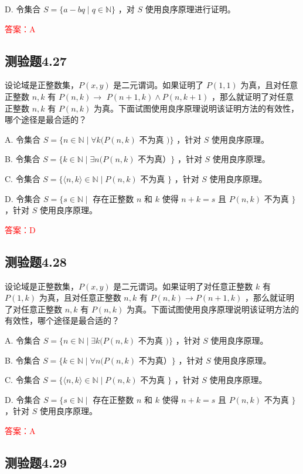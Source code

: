 \documentclass[UTF8, heading=true]{ctexart}
\begin{document}
D. 令集合 $S=\{a-b q \mid q \in \mathbb{N}\}$ ，对 $S$ 使用良序原理进行证明。


\textcolor{red}{答案：A}

\subsection{测验题4.27}

设论域是正整数集，$P(x, y)$ 是二元谓词。如果证明了 $P(1,1)$ 为真，且对任意正整数 $n, k$ 有 $P(n, k) \rightarrow$ $P(n+1, k) \wedge P(n, k+1)$ ，那么就证明了对任意正整数 $n, k$ 有 $P(n, k)$ 为真。下面试图使用良序原理说明该证明方法的有效性，哪个途径是最合适的？

A. 令集合 $S=\{n \in \mathbb{N} \mid \forall k(P(n, k)$ 不为真 $)\}$ ，针对 $S$ 使用良序原理。

B. 令集合 $S=\{k \in \mathbb{N} \mid \exists n(P(n, k)$ 不为真）$\}$ ，针对 $S$ 使用良序原理。

C. 令集合 $S=\{\langle n, k\rangle \in \mathbb{N} \mid P(n, k)$ 不为真 $\}$ ，针对 $S$ 使用良序原理。

D. 令集合 $S=\{s \in \mathbb{N} \mid$ 存在正整数 $n$ 和 $k$ 使得 $n+k=s$ 且 $P(n, k)$ 不为真 $\}$ ，针对 $S$ 使用良序原理。

\textcolor{red}{答案：D}

\subsection{测验题4.28}

设论域是正整数集，$P(x, y)$ 是二元谓词。如果证明了对任意正整数 $k$ 有 $P(1, k)$ 为真，且对任意正整数 $n, k$ 有 $P(n, k) \rightarrow P(n+1, k)$ ，那么就证明了对任意正整数 $n, k$ 有 $P(n, k)$ 为真。下面试图使用良序原理说明该证明方法的有效性，哪个途径是最合适的？

A. 令集合 $S=\{n \in \mathbb{N} \mid \exists k(P(n, k)$ 不为真 $)\}$ ，针对 $S$ 使用良序原理。

B. 令集合 $S=\{k \in \mathbb{N} \mid \forall n(P(n, k)$ 不为真）$\}$ ，针对 $S$ 使用良序原理。

C. 令集合 $S=\{\langle n, k\rangle \in \mathbb{N} \mid P(n, k)$ 不为真 $\}$ ，针对 $S$ 使用良序原理。

D. 
令集合 $S=\{s \in \mathbb{N} \mid$ 存在正整数 $n$ 和 $k$ 使得 $n+k=s$ 且 $P(n, k)$ 不为真 $\}$ ，针对 $S$ 使用良序原理。

\textcolor{red}{答案：A}

\subsection{测验题4.29}
\end{document}
